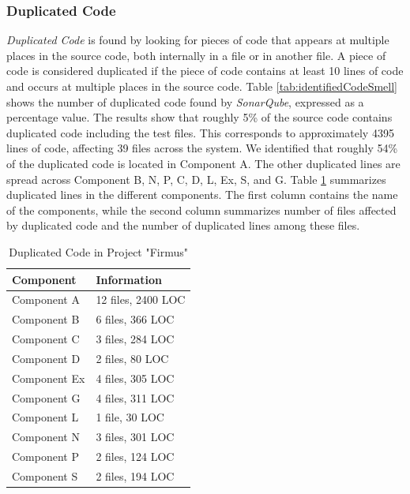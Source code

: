 \subsubsection{Duplicated Code}
\textit{Duplicated Code} is found by looking for pieces of code that appears at multiple places in the source code, both internally in a file or in another file. A piece of code is considered duplicated if the piece of code contains at least 10 lines of code and occurs at multiple places in the source code. Table \ref{tab:identifiedCodeSmell} shows the number of duplicated code found by \textit{SonarQube}, expressed as a percentage value. The results show that roughly 5\% of the source code contains duplicated code including the test files. This corresponds to approximately 4395 lines of code, affecting 39 files across the system. We identified that roughly 54\% of the duplicated code is located in Component A. The other duplicated lines are spread across Component B, N, P, C, D, L, Ex, S, and G. Table \ref{tab:duplicatedLines} summarizes duplicated lines in the different components. The first column contains the name of the components, while the second column summarizes number of files affected by duplicated code and the number of duplicated lines among these files.

\begin{table}[ht!]
\centering
\caption{Duplicated Code in Project "Firmus"}
\label{tab:duplicatedLines}
\begin{tabular}{|l|l|}
\hline
\textbf{Component}			& \textbf{Information} \\ \hline
Component A 				& 12 files, 2400 LOC \\ \hline
Component B 				& 6 files, 366 LOC \\ \hline
Component C 				& 3 files, 284 LOC \\ \hline
Component D 				& 2 files, 80 LOC \\ \hline
Component Ex 				& 4 files, 305 LOC \\ \hline
Component G 				& 4 files, 311 LOC \\ \hline
Component L 				& 1 file, 30 LOC \\ \hline
Component N 				& 3 files, 301 LOC \\ \hline
Component P 				& 2 files, 124 LOC \\ \hline
Component S 				& 2 files, 194 LOC \\ \hline
\end{tabular}
\end{table}


